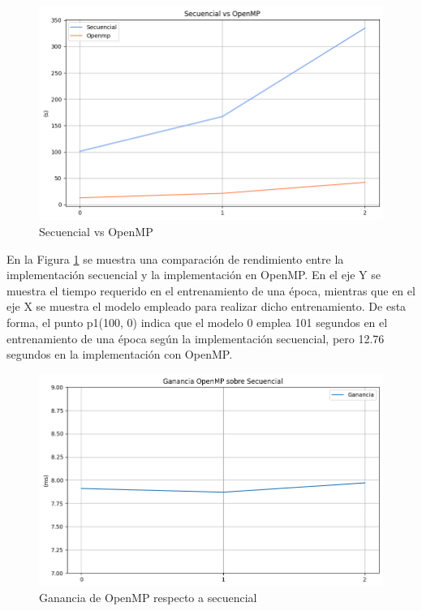 \begin{figure}[H]
	\centering
	\includegraphics[scale=0.5]{imagenes/sec_openmp.png}  
	\caption{Secuencial vs OpenMP}
	\label{fig:sec_openmp}
\end{figure}

En la Figura \ref{fig:sec_openmp} se muestra una comparación de rendimiento entre la implementación secuencial y la implementación en OpenMP. En el eje Y se muestra el tiempo requerido en el entrenamiento de una época, mientras que en el eje X se muestra el modelo empleado para realizar dicho entrenamiento. De esta forma, el punto p1(100, 0) indica que el modelo 0 emplea 101 segundos en el entrenamiento de una época según la implementación secuencial, pero 12.76 segundos en la implementación con OpenMP.

\begin{figure}[H]
	\centering
	\includegraphics[scale=0.5]{imagenes/ganancia_sec_openmp.png}  
	\caption{Ganancia de OpenMP respecto a secuencial}
	\label{fig:ganancia_sec_openmp}
\end{figure}

